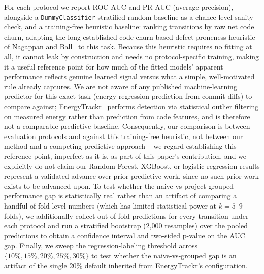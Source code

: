 \documentclass[preprint,12pt]{elsarticle}
\begin{document}
For each protocol we report ROC-AUC and PR-AUC (average precision), alongside a \texttt{DummyClassifier} stratified-random baseline as a chance-level sanity check, and a training-free heuristic baseline: ranking transitions by raw net code churn, adapting the long-established code-churn-based defect-proneness heuristic of Nagappan and Ball~\cite{nagappan2005churn} to this task. Because this heuristic requires no fitting at all, it cannot leak by construction and needs no protocol-specific training, making it a useful reference point for how much of the fitted models' apparent performance reflects genuine learned signal versus what a simple, well-motivated rule already captures. We are not aware of any published machine-learning predictor for this exact task (energy-regression prediction from commit diffs) to compare against; EnergyTrackr~\citep{bechet2026energytrackr} performs detection via statistical outlier filtering on measured energy rather than prediction from code features, and is therefore not a comparable predictive baseline. Consequently, our comparison is between evaluation protocols and against this training-free heuristic, not between our method and a competing predictive approach -- we regard establishing this reference point, imperfect as it is, as part of this paper's contribution, and we explicitly do not claim our Random Forest, XGBoost, or logistic regression results represent a validated advance over prior predictive work, since no such prior work exists to be advanced upon. To test whether the naive-vs-project-grouped performance gap is statistically real rather than an artifact of comparing a handful of fold-level numbers (which has limited statistical power at $k=5$--$9$ folds), we additionally collect out-of-fold predictions for every transition under each protocol and run a stratified bootstrap (2{,}000 resamples) over the pooled predictions to obtain a confidence interval and two-sided p-value on the AUC gap. Finally, we sweep the regression-labeling threshold across $\{10\%, 15\%, 20\%, 25\%, 30\%\}$ to test whether the naive-vs-grouped gap is an artifact of the single 20\% default inherited from EnergyTrackr's configuration.
\end{document}
